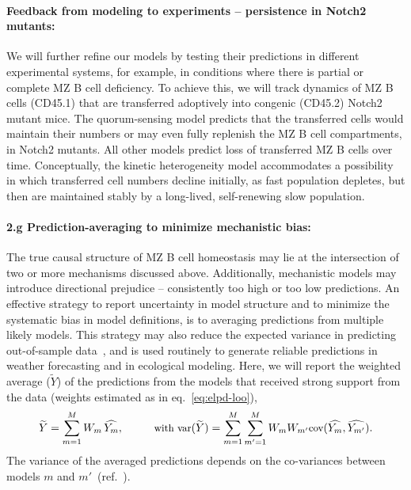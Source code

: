 \documentclass[11pt]{article}
\newcommand{\para}[1]{\vspace*{-4.5mm}\paragraph{#1}}
\begin{document}


\para{{Feedback from modeling to experiments -- persistence in Notch2 mutants:}}
We will further refine our models by testing their predictions in different experimental systems, for example, in conditions where there is partial or complete MZ B cell deficiency.
To achieve this, we will track dynamics of MZ B cells (CD45.1) that are transferred adoptively into congenic (CD45.2)  Notch2 mutant mice. %
The quorum-sensing model predicts that the transferred cells would maintain their numbers or may even fully replenish the MZ B cell compartments, in Notch2 mutants.
All other models predict loss of transferred MZ B cells over time.
Conceptually, the kinetic heterogeneity model accommodates a possibility in which transferred cell numbers decline initially, as fast population depletes, but then are maintained stably by a long-lived, self-renewing slow population.


\para{2.g Prediction-averaging to minimize  mechanistic bias:}
The true causal structure of MZ B cell homeostasis may lie at the intersection of two or more mechanisms discussed above.
Additionally, mechanistic models may introduce directional prejudice -- consistently too high or too low predictions. 
An effective strategy to report uncertainty in model structure and to minimize the systematic bias in model definitions, is to averaging predictions from multiple likely models. 
This strategy may also reduce the expected variance in predicting out-of-sample data~\cite{Wintle:2003, Dormann:2018}, and is used routinely to generate reliable predictions  in weather forecasting and in ecological modeling.
Here, we will report the weighted average ($\widetilde{Y}$) of the predictions from the models that received strong support from the data (weights estimated as in eq.~\ref{eq:elpd-loo}),
\vspace{-1mm}
\begin{equation} \small
\widetilde{Y} = \sum_{m=1}^{M} W_{m} \, \widehat{Y_{m}}, \quad \quad  \quad
\text{with } \text{var}(\widetilde{Y}) =  \sum_{m=1}^{M} \sum_{m'=1}^{M} W_{m} W_{m'} \text{cov}(\widehat{Y_{m}}, \widehat{Y_{m'}}).
\label{eq:model-averaging}
\vspace{-2mm}
\end{equation}
The variance of the averaged predictions depends on the co-variances between models $m$ and $m'$~(ref.~).
\end{document}
